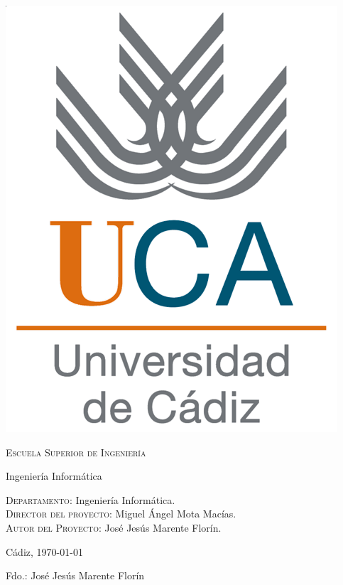 {
  \thispagestyle{empty}
  \centering
  \includegraphics[width=.2\textwidth]{0_inicio/logo_uca.png}

  \bigskip
  \bigskip
  \bigskip

  \begin{changemargin}{2em}{2em}

    \begin{center}
      {\Huge \textsc{\nohyphens{Escuela Superior de Ingeniería}}}

      \bigskip
      \bigskip

      {\huge \nohyphens{Ingeniería Informática}}

      \bigskip
      \bigskip
      \bigskip
      \bigskip

      \begin{doublespace}
        {\LARGE \nohyphens{\nombreProyecto}}
      \end{doublespace}


      \bigskip
      \bigskip
      \bigskip
      \bigskip

    \end{center}
  \end{changemargin}
  \begin{changemargin}{2em}{1em}
  \begin{flushleft}
    \Large

    \textsc{Departamento}: \nohyphens{Ingeniería Informática.} \\
    \textsc{Director del proyecto}: \nohyphens{Miguel Ángel Mota Macías.} \\
    \textsc{Autor del Proyecto}: \nohyphens{José Jesús Marente Florín}. \\
  \end{flushleft}

  \end{changemargin}

  \bigskip
  \bigskip
  \bigskip

  \begin{flushright}
    \large
    Cádiz, \today

    \bigskip
    \bigskip
    \bigskip
    \bigskip
    \bigskip
    \bigskip

    Fdo.: José Jesús Marente Florín

  \end{flushright}

}



